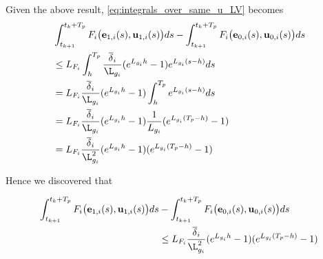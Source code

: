 Given the above result, \eqref{eq:integrals_over_same_u_LV} becomes
\begin{align}
  &\int_{t_{k+1}}^{t_k + T_p} F_i \big(\vect{e}_{1,i}(s), \vect{u}_{1,i} (s)\big) d s
    - \int_{t_{k+1}}^{t_k + T_p} F_i \big(\vect{e}_{0,i}(s), \vect{u}_{0,i} (s)\big) d s \\
  & \leq L_{F_i}\int_{h}^{T_p} \dfrac{\overline{\delta}_i}{\L_{g_i}} (e^{L_{g_i}h} - 1) e^{L_{g_i}(s-h)} d s \\
  &=  L_{F_i} \dfrac{\overline{\delta}_i}{\L_{g_i}} (e^{L_{g_i}h} - 1) \int_{h}^{T_p} e^{L_{g_i}(s-h)} d s \\
  & = L_{F_i} \dfrac{\overline{\delta}_i}{\L_{g_i}} (e^{L_{g_i} h} - 1) \dfrac{1}{L_{g_i}}(e^{L_{g_i}(T_p-h)} - 1) \\
  & = L_{F_i} \dfrac{\overline{\delta}_i}{\L_{g_i}^2} (e^{L_{g_i} h} - 1) (e^{L_{g_i}(T_p-h)} - 1)
\end{align}


Hence we discovered that
\begin{bw_box}
\begin{align}
  \int_{t_{k+1}}^{t_k + T_p} F_i \big(\vect{e}_{1,i}(s), \vect{u}_{1,i} (s)\big) d s
  &- \int_{t_{k+1}}^{t_k + T_p} F_i \big(\vect{e}_{0,i}(s), \vect{u}_{0,i} (s)\big) d s \\
  & \leq L_{F_i} \dfrac{\overline{\delta}_i}{\L_{g_i}^2} (e^{L_{g_i} h} - 1) (e^{L_{g_i}(T_p-h)} - 1)
\label{eq:end_result_two_integrals}
\end{align}
\end{bw_box}


